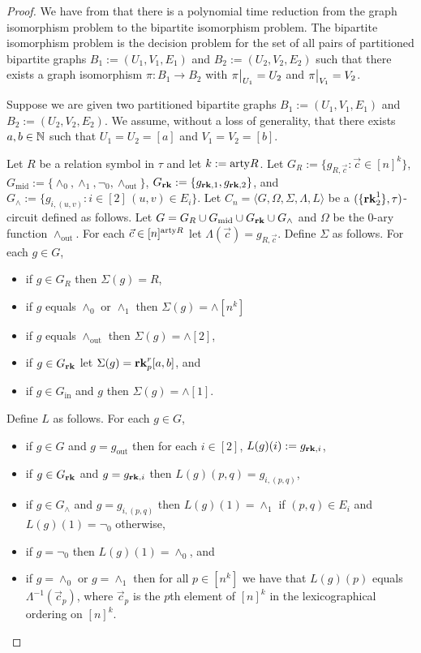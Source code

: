 \documentclass[../paper.tex]{subfiles}
\begin{document}
\begin{proof}
  We have from \cite{} that there is a polynomial time reduction from the graph
  isomorphism problem to the bipartite isomorphism problem. The bipartite
  isomorphism problem is the decision problem for the set of all pairs of
  partitioned bipartite graphs $B_1 := (U_1, V_1, E_1)$ and $B_2 := (U_2, V_2,
  E_2)$ such that there exists a graph isomorphism $\pi : B_1 \rightarrow B_2$
  with $\restr{\pi}{U_1} = U_2$ and $\restr{\pi}{V_1} = V_2$.

  Suppose we are given two partitioned bipartite graphs $B_1 := (U_1, V_1, E_1)$
  and $B_2 := (U_2, V_2, E_2)$. We assume, without a loss of generality, that
  there exists $a, b \in \mathbb{N}$ such that $U_1 = U_2 = [a]$ and $V_1 = V_2 =
  [b]$.

  Let $R$ be a relation symbol in $\tau$ and let $k := \mathrm{arty}{R}$. Let $G_{R} :=
  \{g_{R, \vec{c}} : \vec{c} \in [n]^k\}$, $G_{\text{mid}} := \{\land_0,
  \land_1, \neg_0, \land_{\text{out}} \}$, $G_{\text{\textbf{rk}}} : = \{ g_{\text{\textbf{rk}}, 1},
  g_{\text{\textbf{rk}}, 2}\}$, and $G_{\land} := \{g_{i, (u,v)} : i \in [2] \, (u,v) \in E_i
  \}$. Let $C_n = \langle G, \Omega, \Sigma, \Lambda, L \rangle$ be a
  $(\{\text{\textbf{rk}}^{1}_2\}, \tau)$-circuit defined as follows. Let $G = G_R \cup
  G_{\text{mid}} \cup G_{\text{\textbf{rk}}} \cup G_{\land}$ and $\Omega$ be the $0$-ary
  function $\land_{\text{out}}$. For each $\vec{c} \in [n]^{\mathrm{arty}{R}}$ let
  $\Lambda(\vec{c}) = g_{R, \vec{c}}$. Define $\Sigma$ as follows. For each $g
  \in G$,
  \begin{itemize}
    \setlength\itemsep{0mm}
  \item if $g \in G_R$ then $\Sigma(g) = R$,
  \item if $g$ equals $\land_0$ or $\land_1$ then $\Sigma(g) = \land[n^k]$
  \item if $g$ equals $\land_{\text{out}}$ then $\Sigma(g) = \land[2]$,
  \item if $g \in G_{\text{\textbf{rk}}}$ let $\Sigma(g) = \text{\textbf{rk}}^r_p [a,b]$, and
  \item if $g \in G_{\text{in}}$ and $g$ then $\Sigma(g) = \land[1]$.
  \end{itemize}
  Define $L$ as follows. For each $g \in G$,
  \begin{itemize}
    \setlength\itemsep{0mm}
  \item if $g \in G$ and $g = g_{\text{out}}$ then for each $i \in [2]$,
    $L(g)(i) := g_{\text{\textbf{rk}}, i}$,
  \item if $g \in G_{\text{\textbf{rk}}}$ and $g = g_{\text{\textbf{rk}}, i}$ then $L(g)(p,q) = g_{i,
      (p,q)}$,
  \item if $g \in G_{\land}$ and $g = g_{i, (p,q)}$ then $L(g)(1) = \land_1$ if
    $(p,q) \in E_i$ and $L(g)(1) = \neg_0$ otherwise,
  \item if $g = \neg_0$ then $L(g)(1) = \land_0$, and
  \item if $g = \land_0$ or $g = \land_1$ then for all $p \in [n^k]$ we have
    that $L(g)(p)$ equals $\Lambda^{-1}(\vec{c}_p)$, where $\vec{c}_p$ is the
    $p$th element of $[n]^k$ in the lexicographical ordering on $[n]^k$.
  \end{itemize}


\end{proof}
\end{document}
